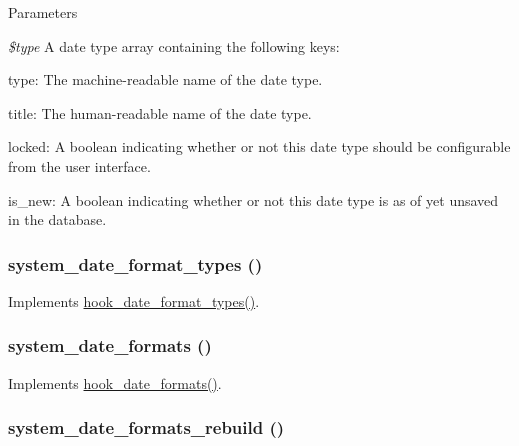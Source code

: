 \begin{DoxyParams}{Parameters}
\item[{\em \$type}]A date type array containing the following keys:
\begin{DoxyItemize}
\item type: The machine-\/readable name of the date type.
\item title: The human-\/readable name of the date type.
\item locked: A boolean indicating whether or not this date type should be configurable from the user interface.
\item is\_\-new: A boolean indicating whether or not this date type is as of yet unsaved in the database. 
\end{DoxyItemize}\end{DoxyParams}
\hypertarget{system_8module_a40f95fb822909e33c9dc245f25b7cea7}{
\subsubsection[{system\_\-date\_\-format\_\-types}]{\setlength{\rightskip}{0pt plus 5cm}system\_\-date\_\-format\_\-types ()}}
\label{system_8module_a40f95fb822909e33c9dc245f25b7cea7}
Implements \hyperlink{group__hooks_gaadde7af71d0b4f827cf7aac1c88c4d23}{hook\_\-date\_\-format\_\-types()}. \hypertarget{system_8module_a07720daca9cb101f5fd80ef97a3a2d85}{
\subsubsection[{system\_\-date\_\-formats}]{\setlength{\rightskip}{0pt plus 5cm}system\_\-date\_\-formats ()}}
\label{system_8module_a07720daca9cb101f5fd80ef97a3a2d85}
Implements \hyperlink{group__hooks_ga2a190ba304193ab7752bfc489463a0d7}{hook\_\-date\_\-formats()}. \hypertarget{system_8module_a963e54c5eae58e038d83b387bda7a9b8}{
\subsubsection[{system\_\-date\_\-formats\_\-rebuild}]{\setlength{\rightskip}{0pt plus 5cm}system\_\-date\_\-formats\_\-rebuild ()}}
